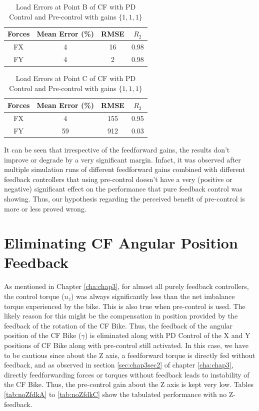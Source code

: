 \begin{table}[h!]
	\centering
	\begin{tabular}{ |c|c|c|c| } 
		\hline
		Forces & Mean Error (\%) & RMSE & $R_2$\\ 
		\hline
		FX & 4&16&0.98\\ 
		FY & 4&2&0.98 \\ 
		\hline
	\end{tabular}
	\caption{Load Errors at Point B of CF with PD Control and Pre-control with gains $\{1,1,1\}$}
	\label{tab:precontrolB2}
\end{table}

\begin{table}[h!]
	\centering
	\begin{tabular}{ |c|c|c|c| } 
		\hline
		Forces & Mean Error (\%) & RMSE & $R_2$\\ 
		\hline
		FX & 4&155&0.95\\ 
		FY & 59&912&0.03 \\ 
		\hline
	\end{tabular}
	\caption{Load Errors at Point C of CF with PD Control and Pre-control with gains $\{1,1,1\}$}
	\label{tab:precontrolC2}
\end{table}

It can be seen that irrespective of the feedforward gains, the results don't improve or degrade by a very significant margin. Infact, it was observed after multiple simulation runs of different feedforward gains combined with different feedback controllers that using pre-control doesn't have a very (positive or negative) significant effect on the performance that pure feedback control was showing. Thus, our hypothesis regarding the perceived benefit of pre-control is more or less proved wrong.


\section{Eliminating CF Angular Position Feedback}
\label{sec:noFeedback}
As mentioned in Chapter \ref{cha:chap3}, for almost all purely feedback controllers, the control torque ($u_z$) was always significantly less than the net imbalance torque experienced by the bike. This is also true when pre-control is used. The likely reason for this might be the compensation in position provided by the feedback of the rotation of the CF Bike. Thus, the feedback of the angular position of the CF Bike ($\gamma$) is eliminated along with PD Control of the X and Y positions of CF Bike along with pre-control still activated. In this case, we have to be cautious since about the Z axis, a feedforward torque is directly fed without feedback, and as observed in section \ref{sec:chap3sec2} of chapter \ref{cha:chap3}, directly feedforwarding forces or torques without feedback leads to instability of the CF Bike. Thus, the pre-control gain about the Z axis is kept very low. Tables \ref{tab:noZfdkA} to \ref{tab:noZfdkC} show the tabulated performance with no Z-feedback. 

